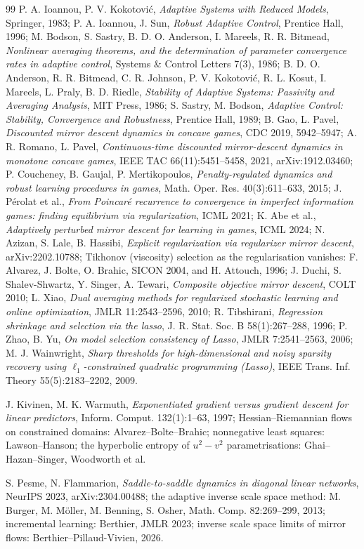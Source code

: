 \begin{thebibliography}{99}
P. A. Ioannou, P. V. Kokotovi\'c, \emph{Adaptive Systems with Reduced Models}, Springer, 1983;
P. A. Ioannou, J. Sun, \emph{Robust Adaptive Control}, Prentice Hall, 1996;
M. Bodson, S. Sastry, B. D. O. Anderson, I. Mareels, R. R. Bitmead, \emph{Nonlinear averaging theorems, and the
determination of parameter convergence rates in adaptive control}, Systems \& Control Letters 7(3), 1986;
B. D. O. Anderson, R. R. Bitmead, C. R. Johnson, P. V. Kokotovi\'c, R. L. Kosut, I. Mareels, L. Praly, B. D. Riedle,
\emph{Stability of Adaptive Systems: Passivity and Averaging Analysis}, MIT Press, 1986;
S. Sastry, M. Bodson, \emph{Adaptive Control: Stability, Convergence and Robustness}, Prentice Hall, 1989;
B. Gao, L. Pavel, \emph{Discounted mirror descent dynamics in concave games}, CDC 2019, 5942--5947;
A. R. Romano, L. Pavel, \emph{Continuous-time discounted mirror-descent dynamics in monotone concave games}, IEEE TAC
66(11):5451--5458, 2021, arXiv:1912.03460;
P. Coucheney, B. Gaujal, P. Mertikopoulos, \emph{Penalty-regulated dynamics and robust learning procedures in games},
Math. Oper. Res. 40(3):611--633, 2015;
J. P\'erolat et al., \emph{From Poincar\'e recurrence to convergence in imperfect information games: finding
equilibrium via regularization}, ICML 2021;
K. Abe et al., \emph{Adaptively perturbed mirror descent for learning in games}, ICML 2024;
N. Azizan, S. Lale, B. Hassibi, \emph{Explicit regularization via regularizer mirror descent}, arXiv:2202.10788;
Tikhonov (viscosity) selection as the regularisation vanishes: F. Alvarez, J. Bolte, O. Brahic, SICON 2004, and
H. Attouch, 1996;
J. Duchi, S. Shalev-Shwartz, Y. Singer, A. Tewari, \emph{Composite objective mirror descent}, COLT 2010;
L. Xiao, \emph{Dual averaging methods for regularized stochastic learning and online optimization}, JMLR
11:2543--2596, 2010;
R. Tibshirani, \emph{Regression shrinkage and selection via the lasso}, J. R. Stat. Soc. B 58(1):267--288, 1996;
P. Zhao, B. Yu, \emph{On model selection consistency of Lasso}, JMLR 7:2541--2563, 2006;
M. J. Wainwright, \emph{Sharp thresholds for high-dimensional and noisy sparsity recovery using $\ell_1$-constrained
quadratic programming (Lasso)}, IEEE Trans. Inf. Theory 55(5):2183--2202, 2009.

J. Kivinen, M. K. Warmuth, \emph{Exponentiated gradient versus gradient descent for linear predictors}, Inform. Comput.
132(1):1--63, 1997;
Hessian--Riemannian flows on constrained domains: Alvarez--Bolte--Brahic; nonnegative least squares: Lawson--Hanson;
the hyperbolic entropy of $u^2 - v^2$ parametrisations: Ghai--Hazan--Singer, Woodworth et al.

S. Pesme, N. Flammarion, \emph{Saddle-to-saddle dynamics in diagonal linear networks}, NeurIPS 2023, arXiv:2304.00488;
the adaptive inverse scale space method: M. Burger, M. M\"oller, M. Benning, S. Osher, Math. Comp. 82:269--299, 2013;
incremental learning: Berthier, JMLR 2023; inverse scale space limits of mirror flows: Berthier--Pillaud-Vivien, 2026.

\end{thebibliography}
